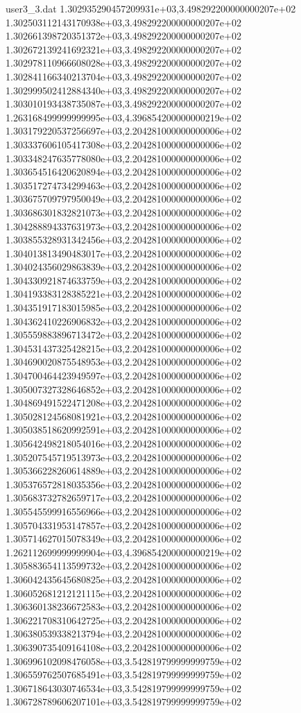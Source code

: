 \begin{filecontents}{user3_3.dat}
1.302935290457209931e+03,3.498292200000000207e+02
1.302503112143170938e+03,3.498292200000000207e+02
1.302661398720351372e+03,3.498292200000000207e+02
1.302672139241692321e+03,3.498292200000000207e+02
1.302978110966608028e+03,3.498292200000000207e+02
1.302841166340213704e+03,3.498292200000000207e+02
1.302999502412884340e+03,3.498292200000000207e+02
1.303010193438735087e+03,3.498292200000000207e+02
1.263168499999999995e+03,4.396854200000000219e+02
1.303179220537256697e+03,2.204281000000000006e+02
1.303337606105417308e+03,2.204281000000000006e+02
1.303348247635778080e+03,2.204281000000000006e+02
1.303654516420620894e+03,2.204281000000000006e+02
1.303517274734299463e+03,2.204281000000000006e+02
1.303675709797950049e+03,2.204281000000000006e+02
1.303686301832821073e+03,2.204281000000000006e+02
1.304288894337631973e+03,2.204281000000000006e+02
1.303855328931342456e+03,2.204281000000000006e+02
1.304013813490483017e+03,2.204281000000000006e+02
1.304024356029863839e+03,2.204281000000000006e+02
1.304330921874633759e+03,2.204281000000000006e+02
1.304193383128385221e+03,2.204281000000000006e+02
1.304351917183015985e+03,2.204281000000000006e+02
1.304362410226906832e+03,2.204281000000000006e+02
1.305559883896713472e+03,2.204281000000000006e+02
1.304531437325428215e+03,2.204281000000000006e+02
1.304690020875548953e+03,2.204281000000000006e+02
1.304700464423949597e+03,2.204281000000000006e+02
1.305007327328646852e+03,2.204281000000000006e+02
1.304869491522471208e+03,2.204281000000000006e+02
1.305028124568081921e+03,2.204281000000000006e+02
1.305038518620992591e+03,2.204281000000000006e+02
1.305642498218054016e+03,2.204281000000000006e+02
1.305207545719513973e+03,2.204281000000000006e+02
1.305366228260614889e+03,2.204281000000000006e+02
1.305376572818035356e+03,2.204281000000000006e+02
1.305683732782659717e+03,2.204281000000000006e+02
1.305545599916556966e+03,2.204281000000000006e+02
1.305704331953147857e+03,2.204281000000000006e+02
1.305714627015078349e+03,2.204281000000000006e+02
1.262112699999999904e+03,4.396854200000000219e+02
1.305883654113599732e+03,2.204281000000000006e+02
1.306042435645680825e+03,2.204281000000000006e+02
1.306052681212121115e+03,2.204281000000000006e+02
1.306360138236672583e+03,2.204281000000000006e+02
1.306221708310642725e+03,2.204281000000000006e+02
1.306380539338213794e+03,2.204281000000000006e+02
1.306390735409164108e+03,2.204281000000000006e+02
1.306996102098476058e+03,3.542819799999999759e+02
1.306559762507685491e+03,3.542819799999999759e+02
1.306718643030746534e+03,3.542819799999999759e+02
1.306728789606207101e+03,3.542819799999999759e+02

\end{filecontents}
